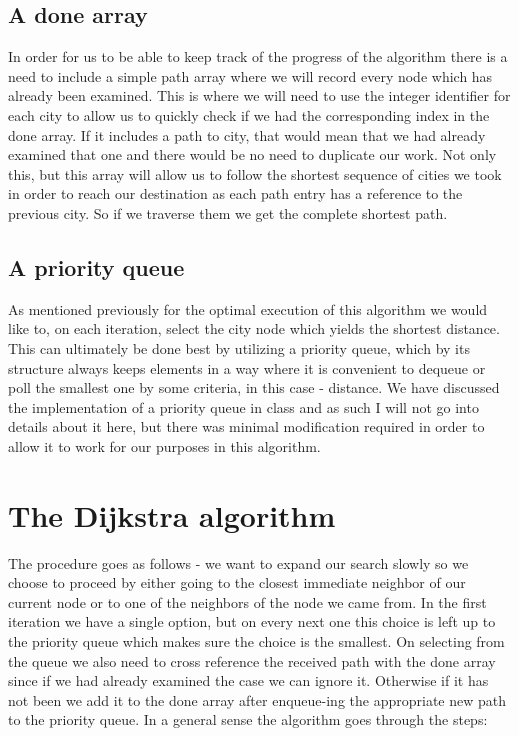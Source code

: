\documentclass[a4paper,11pt]{article}
\begin{document}
\subsection*{A done array}

In order for us to be able to keep track of the progress of the algorithm there is a need to include a simple path array where we will record every node which has already been examined. This is where we will need to use the integer identifier for each city to allow us to quickly check if we had the corresponding index in the done array.  If it includes a path to city, that would mean that we had already examined that one and there would be no need to duplicate our work. Not only this, but this array will allow us to follow the shortest sequence of cities we took in order to reach our destination as each path entry has a reference to the previous city. So if we traverse them we get the complete shortest path.

\subsection*{A priority queue}
As mentioned previously for the optimal execution of this algorithm we would like to, on each iteration, select the city node which yields the shortest distance. This can ultimately be done best by utilizing a priority queue, which by its structure always keeps elements in a way where it is convenient to dequeue or poll the smallest one by some criteria, in this case - distance. We have discussed the implementation of a priority queue in class and as such I will not go into details about it here, but there was minimal modification required in order to allow it to work for our purposes in this algorithm.

\section*{The Dijkstra algorithm}

The procedure goes as follows - we want to expand our search slowly so we choose to proceed by either going to the closest immediate neighbor of our current node or to one of the neighbors of the node we came from. In the first iteration we have a single option, but on every next one this choice is left up to the priority queue which makes sure the choice is the smallest. On selecting from the queue we also need to cross reference the received path with the done array since if we had already examined the case we can ignore it. Otherwise if it has not been we add it to the done array after enqueue-ing the appropriate new path to the priority queue.
In a general sense the algorithm goes through the steps:
\end{document}
